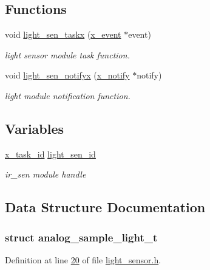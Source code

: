\subsection*{Functions}
\begin{DoxyCompactItemize}
\item 
void \hyperlink{a00018_ae9aa2f8b8e90a92755efbcd161c67bc0}{light\+\_\+sen\+\_\+taskx} (\hyperlink{a00036_de/d37/a00849}{x\+\_\+event} $\ast$event)
\begin{DoxyCompactList}\small\item\em light sensor module task function. \end{DoxyCompactList}\item 
void \hyperlink{a00018_a317b03892739257278fd51ab8003962d}{light\+\_\+sen\+\_\+notifyx} (\hyperlink{a00036_df/d4c/a00851}{x\+\_\+notify} $\ast$notify)
\begin{DoxyCompactList}\small\item\em light module notification function. \end{DoxyCompactList}\end{DoxyCompactItemize}
\subsection*{Variables}
\begin{DoxyCompactItemize}
\item 
\hyperlink{a00036_ad5c3c5fbfd3e4aadf22830395484a71d}{x\+\_\+task\+\_\+id} \hyperlink{a00018_a757e7771170ace1d9f8519bd318ec64a}{light\+\_\+sen\+\_\+id}
\begin{DoxyCompactList}\small\item\em ir\+\_\+sen module handle \end{DoxyCompactList}\end{DoxyCompactItemize}


\subsection{Data Structure Documentation}
\label{dd/d42/a00109}
\hypertarget{a00018_dd/d42/a00109}{}
\subsubsection{struct analog\+\_\+sample\+\_\+light\+\_\+t}


Definition at line \hyperlink{a00018_source_l00020}{20} of file \hyperlink{a00018_source}{light\+\_\+sensor.\+h}.




